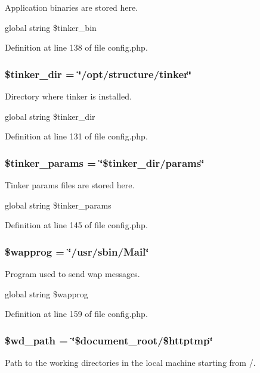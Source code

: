 Application binaries are stored here. 

global string \$tinker\_\-bin 

Definition at line 138 of file config.php.
\subsubsection{\setlength{\rightskip}{0pt plus 5cm}\$tinker\_\-dir = \char`\"{}/opt/structure/tinker\char`\"{}}\label{config_8php_a10}


Directory where tinker is installed. 

global string \$tinker\_\-dir 

Definition at line 131 of file config.php.
\subsubsection{\setlength{\rightskip}{0pt plus 5cm}\$tinker\_\-params = \char`\"{}\$tinker\_\-dir/params\char`\"{}}\label{config_8php_a12}


Tinker params files are stored here. 

global string \$tinker\_\-params 

Definition at line 145 of file config.php.
\subsubsection{\setlength{\rightskip}{0pt plus 5cm}\$wapprog = \char`\"{}/usr/sbin/Mail\char`\"{}}\label{config_8php_a14}


Program used to send wap messages. 

global string \$wapprog 

Definition at line 159 of file config.php.
\subsubsection{\setlength{\rightskip}{0pt plus 5cm}\$wd\_\-path = \char`\"{}\$document\_\-root/\$httptmp\char`\"{}}\label{config_8php_a5}


Path to the working directories in the local machine starting from /. 

